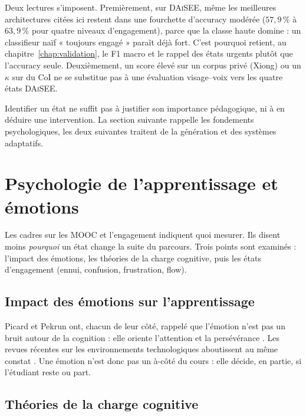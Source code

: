 Deux lectures s'imposent. Premièrement, sur \textsc{DAiSEE}, même les
meilleures architectures citées ici restent dans une fourchette d'accuracy
modérée ($57{,}9\,\%$ à $63{,}9\,\%$ pour quatre niveaux d'engagement),
parce que la classe haute domine : un classifieur naïf « toujours
engagé » paraît déjà fort. C'est pourquoi \emolearn{} retient, au
chapitre~\ref{chap:validation}, le F1 macro et le rappel des états
urgents plutôt que l'accuracy seule. Deuxièmement, un score élevé sur un
corpus privé (Xiong) ou un $\kappa$ sur du CoI ne se substitue pas à une
évaluation visage--voix vers les quatre états \textsc{DAiSEE}.

Identifier un état ne suffit pas à justifier son importance pédagogique,
ni à en déduire une intervention. La section suivante rappelle les
fondements psychologiques, les deux suivantes traitent de la génération
et des systèmes adaptatifs.

\section{Psychologie de l'apprentissage et émotions}
\label{sec:ea-psycho}

Les cadres sur les MOOC et l'engagement indiquent quoi mesurer.
Ils disent moins \emph{pourquoi} un état change la suite du parcours. Trois
points sont examinés : l'impact des émotions, les théories de la charge
cognitive, puis les états d'engagement (ennui, confusion,
frustration, flow).

\subsection{Impact des émotions sur l'apprentissage}

Picard et Pekrun ont, chacun de leur côté, rappelé que l'émotion n'est pas
un bruit autour de la cognition : elle oriente l'attention et la
persévérance \cite{picard1997affective,pekrun2006control}. Les revues
récentes sur les environnements technologiques aboutissent au même constat
\cite{loderer2020beyond,graesser2020emotions}. Une émotion n'est donc pas
un à-côté du cours : elle décide, en partie, si l'étudiant reste ou part.

\subsection{Théories de la charge cognitive}

